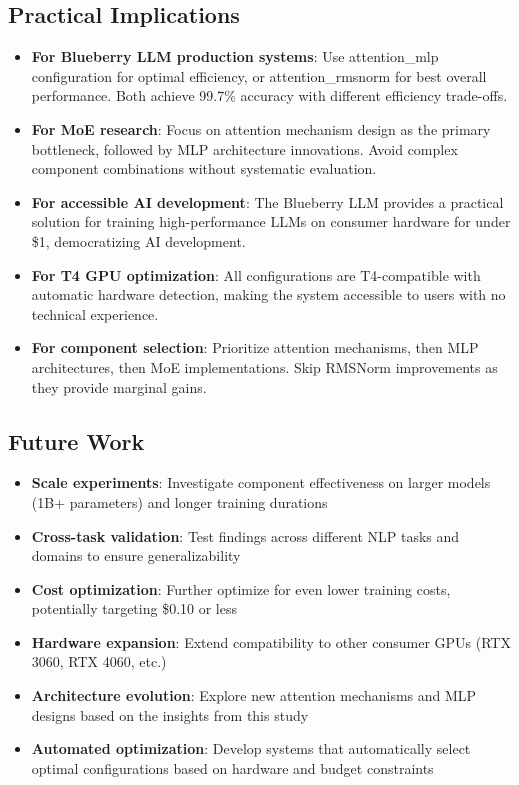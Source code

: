 \documentclass[11pt,a4paper]{article}
\begin{document}
\subsection{Practical Implications}

\begin{itemize}
    \item \textbf{For Blueberry LLM production systems}: Use attention\_mlp configuration for optimal efficiency, or attention\_rmsnorm for best overall performance. Both achieve 99.7\% accuracy with different efficiency trade-offs.
    \item \textbf{For MoE research}: Focus on attention mechanism design as the primary bottleneck, followed by MLP architecture innovations. Avoid complex component combinations without systematic evaluation.
    \item \textbf{For accessible AI development}: The Blueberry LLM provides a practical solution for training high-performance LLMs on consumer hardware for under \$1, democratizing AI development.
    \item \textbf{For T4 GPU optimization}: All configurations are T4-compatible with automatic hardware detection, making the system accessible to users with no technical experience.
    \item \textbf{For component selection}: Prioritize attention mechanisms, then MLP architectures, then MoE implementations. Skip RMSNorm improvements as they provide marginal gains.
\end{itemize}

\subsection{Future Work}

\begin{itemize}
    \item \textbf{Scale experiments}: Investigate component effectiveness on larger models (1B+ parameters) and longer training durations
    \item \textbf{Cross-task validation}: Test findings across different NLP tasks and domains to ensure generalizability
    \item \textbf{Cost optimization}: Further optimize for even lower training costs, potentially targeting \$0.10 or less
    \item \textbf{Hardware expansion}: Extend compatibility to other consumer GPUs (RTX 3060, RTX 4060, etc.)
    \item \textbf{Architecture evolution}: Explore new attention mechanisms and MLP designs based on the insights from this study
    \item \textbf{Automated optimization}: Develop systems that automatically select optimal configurations based on hardware and budget constraints
\end{itemize}
\end{document}
